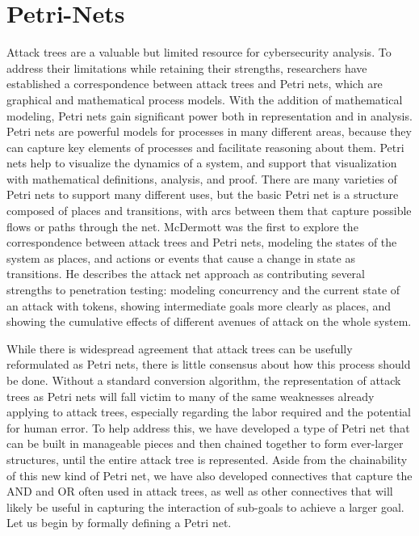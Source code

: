 \section{Petri-Nets}
Attack trees are a valuable but limited resource for cybersecurity analysis. To address their limitations while retaining their strengths, researchers have established a correspondence between attack trees and Petri nets, which are graphical and mathematical process models. With the addition of mathematical modeling, Petri nets gain significant power both in representation and in analysis. Petri nets are powerful models for processes in many different areas, because they can capture key elements of processes and facilitate reasoning about them. Petri nets help to visualize the dynamics of a system, and support that visualization with mathematical definitions, analysis, and proof. There are many varieties of Petri nets to support many different uses, but the basic Petri net is a structure composed of places and transitions, with arcs between them that capture possible flows or paths through the net. McDermott  \cite{McDermott:2001:ANP:366173.366183} was the first to explore the correspondence between attack trees and Petri nets, modeling the states of the system as places, and actions or events that cause a change in state as transitions. He describes the attack net approach as contributing several strengths to penetration testing: modeling concurrency and the current state of an attack with tokens, showing intermediate goals more clearly as places, and showing the cumulative effects of different avenues of attack on the whole system. 
\par While there is widespread agreement that attack trees can be usefully reformulated as Petri nets, there is little consensus about how this process should be done.  Without a standard conversion algorithm, the representation of attack trees as Petri nets will fall victim to many of the same weaknesses already applying to attack trees, especially regarding the labor required and the potential for human error. To help address this, we have developed a type of Petri net that can be built in manageable pieces and then chained together to form ever-larger structures, until the entire attack tree is represented. Aside from the chainability of this new kind of Petri net, we have also developed connectives that capture the AND and OR often used in attack trees, as well as other connectives that will likely be useful in capturing the interaction of sub-goals to achieve a larger goal. Let us begin by formally defining a Petri net. 
